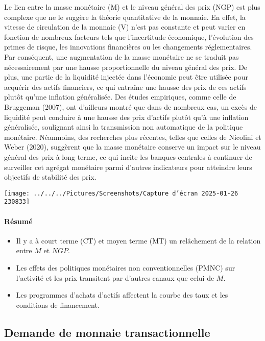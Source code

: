 \documentclass[a4paper, 12pt]{report}
\begin{document}
Le lien entre la masse monétaire (M) et le niveau général des prix (NGP) est plus complexe que ne le suggère la théorie quantitative de la monnaie. En effet, la vitesse de circulation de la monnaie (V) n'est pas constante et peut varier en fonction de nombreux facteurs tels que l'incertitude économique, l'évolution des primes de risque, les innovations financières ou les changements réglementaires. Par conséquent, une augmentation de la masse monétaire ne se traduit pas nécessairement par une hausse proportionnelle du niveau général des prix. De plus, une partie de la liquidité injectée dans l'économie peut être utilisée pour acquérir des actifs financiers, ce qui entraîne une hausse des prix de ces actifs plutôt qu'une inflation généralisée. Des études empiriques, comme celle de Bruggeman (2007), ont d'ailleurs montré que dans de nombreux cas, un excès de liquidité peut conduire à une hausse des prix d'actifs plutôt qu'à une inflation généralisée, soulignant ainsi la transmission non automatique de la politique monétaire. Néanmoins, des recherches plus récentes, telles que celles de Nicolini et Weber (2020), suggèrent que la masse monétaire conserve un impact sur le niveau général des prix à long terme, ce qui incite les banques centrales à continuer de surveiller cet agrégat monétaire parmi d'autres indicateurs pour atteindre leurs objectifs de stabilité des prix.
	
\begin{center}
	\texttt{[image: ../../../Pictures/Screenshots/Capture d'écran 2025-01-26 230833]}
\end{center}	


\paragraph{Résumé}
\begin{itemize}
	\item Il y a à court terme (CT) et moyen terme (MT) un relâchement de la relation entre \(M\) et \(NGP\).
	\item Les effets des politiques monétaires non conventionnelles (PMNC) sur l'activité et les prix transitent par d'autres canaux que celui de \(M\).
	\item Les programmes d'achats d'actifs affectent la courbe des taux et les conditions de financement.
\end{itemize}

\subsection{Demande de monnaie transactionnelle}
\end{document}

